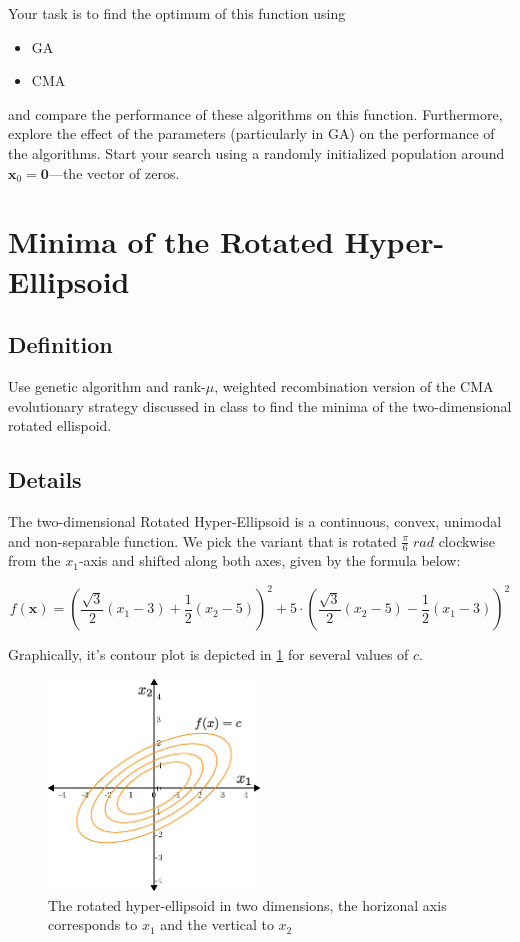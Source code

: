 \documentclass[11pt]{article}
\begin{document}
Your task is to find the optimum of this function using
\begin{itemize}
\item GA
\item CMA
\end{itemize}
and compare the performance of these algorithms on this function.
Furthermore, explore the effect of the parameters (particularly in GA) on the
performance of the algorithms. Start your search using a randomly initialized population around \(\mathbf{x}_0 = \mathbf{0}\)---the vector of zeros.
\section{Minima of the Rotated Hyper-Ellipsoid}
\label{sec:orgb43239e}
\subsection{Definition}
\label{sec:org45394c8}
  Use genetic algorithm and rank-\(\mu\), weighted recombination version of the CMA
evolutionary strategy discussed in class to find the minima of the
two-dimensional rotated ellispoid.
\subsection{Details}
\label{sec:org65aca8b}
The two-dimensional Rotated Hyper-Ellipsoid is a continuous, convex, unimodal
and non-separable function. We pick the variant that is rotated \(\frac{\pi}{6} \; \si{rad}\) clockwise from the \(x_1\)-axis and shifted along
both axes, given by the formula below:

\begin{equation}
f(\mathbf{x}) = \left( \dfrac{\sqrt{3}}{2} (x_1 - 3) + \dfrac{1}{2} (x_2 - 5) \right)^2 + 5 \cdot \left(  \dfrac{\sqrt{3}}{2} (x_2 - 5) - \dfrac{1}{2} (x_1 - 3)  \right)^2
\end{equation}


Graphically, it's contour plot is depicted in \cref{ellipsoid} for several
  values of \(c\).
\begin{figure}[htbp]
\centering
\includegraphics[width=0.5\textwidth]{images/ellipsoid.eps}
\caption{\label{ellipsoid}
The rotated hyper-ellipsoid in two dimensions, the horizonal axis corresponds to \(x_1\) and the vertical to \(x_2\)}
\end{figure}
\end{document}
